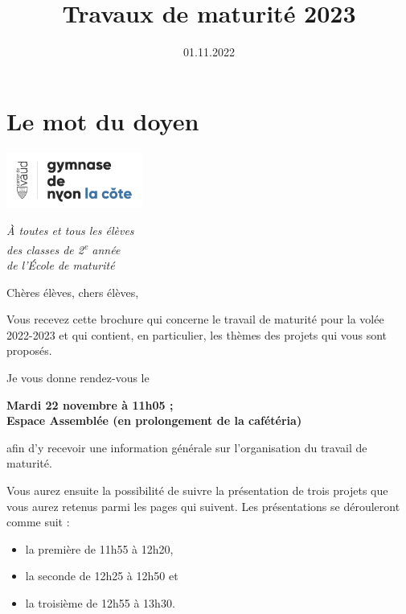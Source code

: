 \documentclass[
  10pt,
  french,
  a5paper,
  openany]{book}
\title{Travaux de maturité 2023}
\author{}
\date{\vspace{-2.5em}01.11.2022}
\providecommand{\tightlist}{%
  \setlength{\itemsep}{0pt}\setlength{\parskip}{0pt}}
\newenvironment{signature}{\begin{flushright}}{\end{flushright}}
\begin{document}
\maketitle

{
\setcounter{tocdepth}{0}
\tableofcontents
}
\hypertarget{le-mot-du-doyen}{%
\chapter*{Le mot du doyen}\label{le-mot-du-doyen}}

\includegraphics[width=\textwidth,height=5em]{images/logoGNLC.png}


\begin{signature}
\emph{À toutes et tous les élèves}\\
\emph{des classes de 2\textsuperscript{e} année}\\
\emph{de l'École de maturité}

\end{signature}


Chères élèves, chers élèves,

Vous recevez cette brochure qui concerne le travail de maturité pour la volée 2022-2023 et qui contient, en particulier, les thèmes des projets qui vous sont proposés.

Je vous donne rendez-vous le

\begin{center}
\textbf{Mardi 22 novembre à 11h05 ;\\
Espace Assemblée (en prolongement de la cafétéria)}

\end{center}

afin d'y recevoir une information générale sur l'organisation du travail de maturité.

Vous aurez ensuite la possibilité de suivre la présentation de trois projets que vous aurez retenus parmi les pages qui suivent. Les présentations se dérouleront comme suit :

\begin{itemize}
\tightlist
\item
  la première de 11h55 à 12h20,
\item
  la seconde de 12h25 à 12h50 et
\item
  la troisième de 12h55 à 13h30.
\end{itemize}
\end{document}
